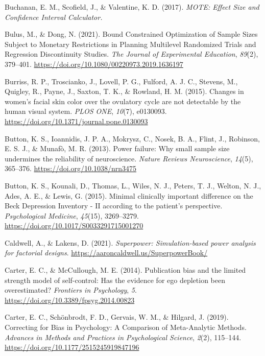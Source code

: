 \documentclass[
  oneside]{krantz}
\newlength{\cslhangindent}
\newlength{\cslentryspacingunit} %
\newenvironment{CSLReferences}[2] %
 {%
  \setlength{\parindent}{0pt}
  \ifodd #1
  \let\oldpar\par
  \def\par{\hangindent=\cslhangindent\oldpar}
  \fi
  \setlength{\parskip}{#2\cslentryspacingunit}
 }%
 {}
\begin{document}
\begin{CSLReferences}{1}{0}
\leavevmode{}%
Buchanan, E. M., Scofield, J., \& Valentine, K. D. (2017). \emph{{MOTE}:
{Effect Size} and {Confidence Interval Calculator}.}

\leavevmode{}%
Bulus, M., \& Dong, N. (2021). Bound {Constrained Optimization} of
{Sample Sizes Subject} to {Monetary Restrictions} in {Planning
Multilevel Randomized Trials} and {Regression Discontinuity Studies}.
\emph{The Journal of Experimental Education}, \emph{89}(2), 379--401.
\url{https://doi.org/10.1080/00220973.2019.1636197}

\leavevmode{}%
Burriss, R. P., Troscianko, J., Lovell, P. G., Fulford, A. J. C.,
Stevens, M., Quigley, R., Payne, J., Saxton, T. K., \& Rowland, H. M.
(2015). Changes in women's facial skin color over the ovulatory cycle
are not detectable by the human visual system. \emph{PLOS ONE},
\emph{10}(7), e0130093.
\url{https://doi.org/10.1371/journal.pone.0130093}

\leavevmode{}%
Button, K. S., Ioannidis, J. P. A., Mokrysz, C., Nosek, B. A., Flint,
J., Robinson, E. S. J., \& Munafò, M. R. (2013). Power failure: Why
small sample size undermines the reliability of neuroscience.
\emph{Nature Reviews Neuroscience}, \emph{14}(5), 365--376.
\url{https://doi.org/10.1038/nrn3475}

\leavevmode{}%
Button, K. S., Kounali, D., Thomas, L., Wiles, N. J., Peters, T. J.,
Welton, N. J., Ades, A. E., \& Lewis, G. (2015). Minimal clinically
important difference on the {Beck Depression Inventory} - {II} according
to the patient's perspective. \emph{Psychological Medicine},
\emph{45}(15), 3269--3279.
\url{https://doi.org/10.1017/S0033291715001270}

\leavevmode{}%
Caldwell, A., \& Lakens, D. (2021). \emph{Superpower: Simulation-based
power analysis for factorial designs}.
\url{https://aaroncaldwell.us/SuperpowerBook/}

\leavevmode{}%
Carter, E. C., \& McCullough, M. E. (2014). Publication bias and the
limited strength model of self-control: Has the evidence for ego
depletion been overestimated? \emph{Frontiers in Psychology}, \emph{5}.
\url{https://doi.org/10.3389/fpsyg.2014.00823}

\leavevmode{}%
Carter, E. C., Schönbrodt, F. D., Gervais, W. M., \& Hilgard, J. (2019).
Correcting for {Bias} in {Psychology}: {A Comparison} of {Meta-Analytic
Methods}. \emph{Advances in Methods and Practices in Psychological
Science}, \emph{2}(2), 115--144.
\url{https://doi.org/10.1177/2515245919847196}


\end{CSLReferences}
\end{document}
